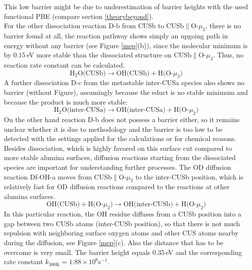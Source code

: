 \documentclass[11pt,DIV=13,BCOR=5mm,a4paper,headinclude]{scrbook}
\begin{document}
This low barrier might be due to underestimation of barrier heights\cite{Zhao05} with the used functional PBE (compare section \ref{theorybeyond}).
\\ 
For the other dissociation reaction D-b from CUSb to CUSb$\parallel$O-$\mu_3$, there is no barrier found at all, the reaction pathway shows simply an upgoing path in energy without any barrier (see Figure \ref{mep}(b)), since the molecular minimum is by $0.15\,$eV more stable than the dissociated structure on CUSb$\parallel$O-$\mu_3$.
Thus, no reaction rate constant can be calculated.
\begin{equation}
  \text{H$_2$O(CUSb)} \rightarrow \text{OH(CUSb)} + \text{H(O-$\mu_3$)} \tag{D-b}
      \label{dissb}
\end{equation}
A further dissociation D-c from the metastable inter-CUSa species also shows no barrier (without Figure), assumingly because the educt is no stable minimum and because the product is much more stable:
\begin{equation}
  \text{H$_2$O(inter-CUSa)} \rightarrow \text{OH(inter-CUSa)} + \text{H(O-$\mu_2$)} \tag{D-c}
      \label{dissc}
\end{equation}
On the other hand reaction D-b does not possess a barrier either, so it remains unclear whether it is due to methodology and the barrier is too low to be detected with the settings applied for the calculations or for chemical reasons.
\\
Besides dissociation, which is highly favored on this surface cut compared to more stable alumina surfaces\cite{Heiden11-20_2018}, diffusion reactions starting from the dissociated species are important for understanding further processes.
The OD diffusion reaction Df-OH-a moves from CUSb$\parallel$O-$\mu_2$ to the inter-CUSb position, which is relatively fast for OD diffusion reactions compared to the reactions at other alumina surfaces\cite{WirthJPCC2012,Wirth2016}.
\begin{equation}
 \text{OH(CUSb)} + \text{H(O-$\mu_2$)} \rightarrow \text{OH(inter-CUSb)} + \text{H(O-$\mu_2$)} \tag{Df-OH-a}
     \label{diffOHa}
\end{equation}
In this particular reaction, the OH residue diffuses from a CUSb position into a gap between two CUSb atoms (inter-CUSb position), so that there is not much repulsion with neighboring surface oxygen atoms and other CUS atoms nearby during the diffusion, see Figure \ref{mep}(c).
Also the distance that has to be overcome is very small.
The barrier height equals $0.35\,$eV and the corresponding rate constant $k_{\text{300K}}=1.88\times 10^6$s$^{-1}$.
\end{document}
